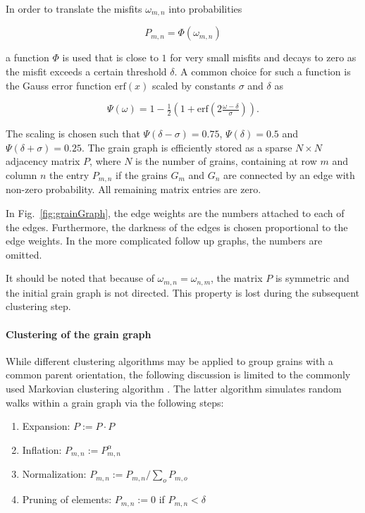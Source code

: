 \documentclass{elsarticle}
\numberwithin{equation}{section}
\begin{document}
In order to translate the misfits $\omega_{m,n}$ into probabilities

\begin{equation*}
  P_{m,n} = \Phi(\omega_{m,n})
\end{equation*}

a function $\Phi$ is used that is close to $1$ for very small misfits and decays to zero as the misfit exceeds a certain threshold $\delta$. A common choice for such a function is the Gauss error function $\mathrm{erf}(x)$ scaled by constants $\sigma$ and $\delta$ as

\begin{equation}
  \label{eq:3}
  \Psi(\omega) = 1 - \tfrac{1}{2}\left(1 + \mathrm{erf}(2 \tfrac{\omega - \delta}{\sigma})\right).
\end{equation}

The scaling is chosen such that $\Psi(\delta - \sigma) = 0.75$, $\Psi(\delta) = 0.5$ and $\Psi(\delta + \sigma) = 0.25$. The grain graph is efficiently stored as a sparse $N \times N$ adjacency matrix $P$, where $N$ is the number of grains, containing at row $m$ and column $n$ the entry $P_{m,n}$ if the grains $G_m$ and $G_n$ are connected by an edge with non-zero probability. All remaining matrix entries are zero. 

In Fig.~\ref{fig:grainGraph}, the edge weights are the numbers attached to each of the edges. Furthermore, the darkness of the edges is chosen proportional to the edge weights. In the more complicated follow up graphs, the numbers are omitted.

It should be noted that because of $\omega_{m,n}=\omega_{n,m}$, the matrix $P$ is symmetric and the initial grain graph is not directed. This property is lost during the subsequent clustering step.



\paragraph{Clustering of the grain graph}
While different clustering algorithms may be applied to group grains with a common parent orientation, the following discussion is limited to the commonly used Markovian clustering algorithm \cite{VanDongen2000}. The latter algorithm simulates random walks within a grain graph via the following steps:

\begin{enumerate}
\item Expansion: $P := P \cdot P$\label{item:1}
\item Inflation: $P_{m,n} := P_{m,n}^{\alpha}$\label{item:2}
\item Normalization: $P_{m,n} := P_{m,n} / \sum_{o} P_{m,o}$\label{item:3}
\item Pruning of elements: $P_{m,n} := 0$ if $P_{m,n} < \delta$\label{item:4}
\end{enumerate}
\end{document}

